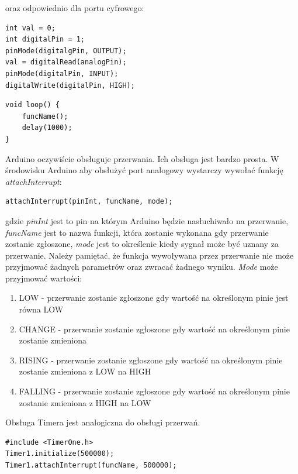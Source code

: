 \documentclass{xmgr}
\begin{document}
oraz odpowiednio dla portu cyfrowego:
\begin{lstlisting}[label=bot-dirs-alg,caption=Obsługa portu cyfrowego w środowisku Arduino]
int val = 0;
int digitalPin = 1;	
pinMode(digitalgPin, OUTPUT);
val = digitalRead(analogPin);
pinMode(digitalPin, INPUT);
digitalWrite(digitalPin, HIGH);
\end{lstlisting}

\begin{lstlisting}[label=bot-dirs-alg,caption=Odpytywanie w nieskończonej pętli w środowisku Arduino]
void loop() {
	funcName();
	delay(1000);
}
\end{lstlisting}

Arduino oczywiście obsługuje przerwania. Ich obsługa jest bardzo prosta. W środowisku Arduino aby obsłużyć port analogowy wystarczy wywołać funkcję \emph{attachInterrupt}:

\begin{lstlisting}[label=bot-dirs-alg,caption=Obsługa przerwań sprzętowych w środowisku Arduino]
attachInterrupt(pinInt, funcName, mode);
\end{lstlisting}
gdzie \emph{pinInt} jest to pin na którym Arduino będzie nasłuchiwało na przerwanie, \emph{funcName} jest to nazwa funkcji, która zostanie wykonana gdy przerwanie zostanie zgłoszone, \emph{mode} jest to określenie kiedy sygnał może być uznany za przerwanie. Należy pamiętać, że funkcja wywoływana przez przerwanie nie może przyjmować żadnych parametrów oraz zwracać żadnego wyniku. \emph{Mode} może przyjmować wartości: 
\begin{enumerate}
	\item LOW - przerwanie zostanie zgłoszone gdy wartość na określonym pinie jest równa LOW
	\item CHANGE - przerwanie zostanie zgłoszone gdy wartość na określonym pinie zostanie zmieniona
	\item RISING - przerwanie zostanie zgłoszone gdy wartość na określonym pinie zostanie zmieniona z LOW na HIGH
	\item FALLING - przerwanie zostanie zgłoszone gdy wartość na określonym pinie zostanie zmieniona z HIGH na LOW
\end{enumerate}

Obsługa Timera jest analogiczna do obsługi przerwań.
\begin{lstlisting}[label=bot-dirs-alg,caption=Przykładowe użycie timer w środowisku Arduino]
#include <TimerOne.h>
Timer1.initialize(500000);
Timer1.attachInterrupt(funcName, 500000);
\end{lstlisting}
\end{document}
